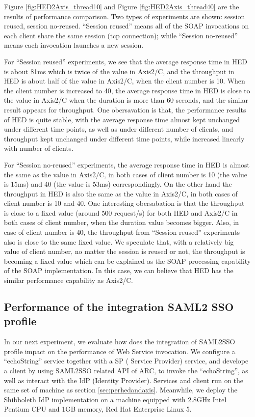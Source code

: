 \documentclass[conference]{IEEEtran}
\begin{document}
Figure \ref{fig:HED2Axis_thread10} and Figure \ref{fig:HED2Axis_thread40} are the results of 
performance comparison. 
Two types of experiments are shown: session reused, session no-reused.
``Session reused'' means all of the SOAP invocations on each client share the same session 
(tcp connection); while ``Session no-reused'' means each invocation launches a new session.

For ``Session reused'' experiments, we see that the average response time in HED is about 81ms
which is twice of the value in Axis2/C, and the throughput in HED is about half of the value in Axis2/C, 
when the client number is 10. When the client number is increased to 40, the average response 
time in HED is close to the value in Axis2/C when the duration is more than 60 seconds, and the 
similar result appears for throughput. One obersavation is that, the performance results of HED is 
quite stable, with the average response time almost kept unchanged under different time points, 
as well as under different number of clients, and throughput kept unchanged under different 
time points, while increased linearly with number of clients.

For ``Session no-reused'' experiments, the average response time in HED is almost the same as
the value in Axis2/C, in both cases of client number is 10 (the value is 15ms) and 40 (the value
 is 53ms) correspondingly. On the other hand the throughput in HED is also the same as the value 
in Axis2/C, in both cases of client number is 10 and 40. One interesting obersabation is that the 
throughput is close to a fixed value (around 500 request/s) for both HED and Axis2/C in both 
cases of client number, when the duration value becomes bigger. Also, in case of client number is
40, the throughput from ``Session reused'' experiments also is close to the same fixed value.
We speculate that, with a relatively big value of client number, no matter the session is reused or
not, the throughput is becoming a fixed value which can be explained as the SOAP processing capability
of the SOAP implementation. In this case, we can believe that HED has the similar performance 
capability as Axis2/C. 

\subsection{Performance of the integration SAML2 SSO profile}
\label{sec:perfsaml2sso}
In our next experiment, we evaluate how does the integration of SAML2SSO profile impact on the 
performance of Web Service invocation. We configure a ``echoString'' service together with a SP (
Service Provider) service, and develope a client by using SAML2SSO related API of ARC, to invoke 
the ``echoString'', as well as interact with the IdP (Identity Provider). Services and client run on
the same set of machine as section \ref{sec:perhedandaxis}. Meanwhile, we deploy the Shibboleth IdP 
implementation on a machine equipped with 2.8GHz Intel Pentium CPU and 1GB memory, Red Hat Enterprise 
Linux 5.
\end{document}
